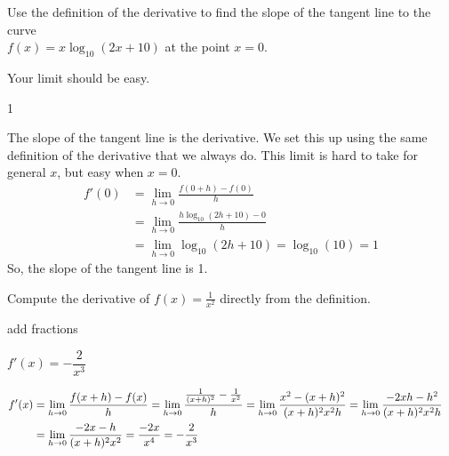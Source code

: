 \begin{question}Use the definition of the derivative to find the slope of the tangent line to the curve\\ $f(x)=x\log_{10}(2x+10)$ at the point $x=0$.
\end{question}
\begin{hint} Your limit should be easy.
\end{hint}
\begin{answer} 1
\end{answer}
\begin{solution} The slope of the tangent line is the derivative.
We set this up using the same definition of the derivative that we always do. This limit is hard to take for general $x$, but easy when $x=0$.
\begin{align*}
f'(0)&=\lim_{h \rightarrow 0} \frac{f(0+h)-f(0)}{h}\\
&=\lim_{h \rightarrow 0} \frac{h\log_{10}(2h+10)-0}{h}\\
&=\lim_{h \rightarrow 0} \log_{10}(2h+10)=\log_{10}(10)=1
\end{align*}
So, the slope of the tangent line is 1.
\end{solution}




\begin{question}[1998H]
Compute the derivative of $f(x)=\frac{1}{x^2}$ directly
from the definition.
\end{question}
\begin{hint} add fractions
\end{hint}
\begin{answer} $f'(x)=-\dfrac{2}{x^3}$
\end{answer}
\begin{solution}
\begin{align*}
f'(x)&=\lim_{h\rightarrow 0}\frac{f(x+h)-f(x)}{h}
=\lim_{h\rightarrow 0}\frac{\frac{1}{(x+h)^2}-\frac{1}{x^2}}{h}
=\lim_{h\rightarrow 0}\frac{x^2-(x+h)^2}{(x+h)^2x^2h}
=\lim_{h\rightarrow 0}\frac{-2xh-h^2}{(x+h)^2x^2h}\cr
&=\lim_{h\rightarrow 0}\frac{-2x-h}{(x+h)^2x^2}=\frac{-2x}{x^4}
=-\frac{2}{x^3}
\end{align*}
\end{solution}





